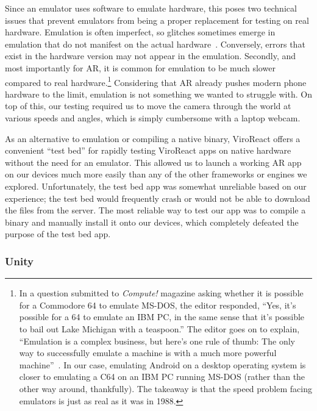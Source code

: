 \documentclass[a4paper, 10pt, american, titlepage]{article}
\begin{document}
Since an emulator uses software to emulate hardware, this poses two technical
issues that prevent emulators from being a proper replacement for testing on
real hardware. Emulation is often imperfect, so glitches sometimes emerge in
emulation that do not manifest on the actual hardware~\autocite{alzaylaee2017}.
Conversely, errors that exist in the hardware version may not appear in the
emulation. Secondly, and most importantly for AR, it is common for emulation to
be much slower compared to real hardware.\footnote{In a question submitted to
\textit{Compute!} magazine asking whether it is possible for a Commodore 64 to
emulate MS-DOS, the editor responded, ``Yes, it's possible for a 64 to emulate
an IBM PC, in the same sense that it's possible to bail out Lake Michigan with a
teaspoon.'' The editor goes on to explain, ``Emulation is a complex business,
but here's one rule of thumb: The only way to successfully emulate a machine is
with a much more powerful machine''~\autocite{warick1988}. In our case,
emulating Android on a desktop operating system is closer to emulating a C64 on
an IBM PC running MS-DOS (rather than the other way around, thankfully). The
takeaway is that the speed problem facing emulators is just as real as it was in
1988.} Considering that AR already pushes modern phone hardware to the limit,
emulation is not something we wanted to struggle with. On top of this, our
testing required us to move the camera through the world at various speeds and
angles, which is simply cumbersome with a laptop webcam.

As an alternative to emulation or compiling a native binary, ViroReact offers a
convenient ``test bed'' for rapidly testing ViroReact apps on native
hardware without the need for an emulator. This allowed us to launch a working
AR app on our devices much more easily than any of the other frameworks or
engines we explored. Unfortunately, the test bed app was somewhat unreliable
based on our experience; the test bed would frequently crash or would not be
able to download the files from the server. The most reliable way to test our
app was to compile a binary and manually install it onto our devices, which
completely defeated the purpose of the test bed app.

\subsubsection{Unity}
\label{sec:unity}
\end{document}
